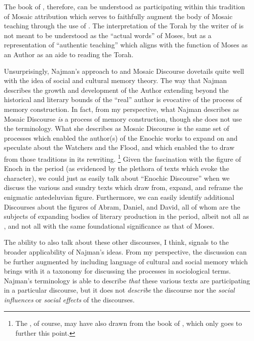 The book of \jub, therefore, can be understood as participating within this tradition of Mosaic attribution which serves to faithfully augment the body of Mosaic teaching through the use of \psy. The interpretation of the Torah by the writer of \jub is not meant to be understood as the ``actual words'' of Moses, but as a representation of ``authentic teaching'' which aligns with the function of Moses as an Author as an aide to reading the Torah.\autocite[13]{najman2003}

Unsurprisingly, Najman's approach to \jub and Mosaic Discourse dovetails quite well with the idea of social and cultural memory theory. The way that Najman describes the growth and development of the Author extending beyond the historical and literary bounds of the ``real'' author is evocative of the process of memory construction. In fact, from my perspective, what Najman describes as Mosaic Discourse \emph{is} a process of memory construction, though she does not use the terminology. What she describes as Mosaic Discourse is the same set of processes which enabled the author(s) of the Enochic works to expand on and speculate about the Watchers and the Flood, and which enabled the \ga to draw from those traditions in its rewriting.%
    \footnote{The \ga, of course, may have also drawn from the book of \jub, which only goes to further this point.}
Given the fascination with the figure of Enoch in the \secondtemple period (as evidenced by the plethora of texts which evoke the character), we could just as easily talk about ``Enochic Discourse'' when we discuss the various and sundry texts which draw from, expand, and reframe the enigmatic antedeluvian figure. Furthermore, we can easily identify additional Discourses about the figures of Abram, Daniel, and David, all of whom are the subjects of expanding bodies of literary production in the \secondtemple period, albeit not all as \psa, and not all with the same foundational significance as that of Moses.

The ability to also talk about these other discourses, I think, signals to the broader applicability of Najman's ideas. From my perspective, the discussion can be further augmented by including language of cultural and social memory which brings with it a taxonomy for discussing the processes in sociological terms. Najman's terminology is able to describe \emph{that} these various texts are participating in a particular discourse, but it does not \emph{describe} the discourse nor the \emph{social influences} or \emph{social effects} of the discourses. 

